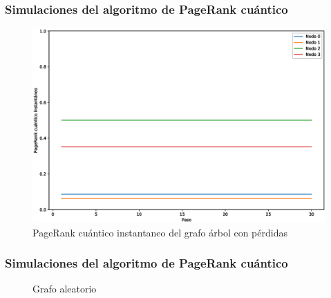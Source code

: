 \documentclass[xetex,mathserif,serif, 8pt]{beamer}
\begin{document}
    \begin{frame}
        \frametitle{Simulaciones del algoritmo de PageRank cuántico}

        \begin{figure}[H]
            \centering
            \includegraphics[width=0.9\linewidth]{img/tree-inst-lossy.eps}
            \caption{PageRank cuántico instantaneo del grafo árbol con pérdidas}
    \end{figure}

\end{frame}




\begin{frame}
    \frametitle{Simulaciones del algoritmo de PageRank cuántico}


    \begin{figure}[H]
        \centering
        \caption[Grafo aleatorio]{Grafo aleatorio}
        \label{fig:any}
    \end{figure}

\end{frame}
\end{document}

